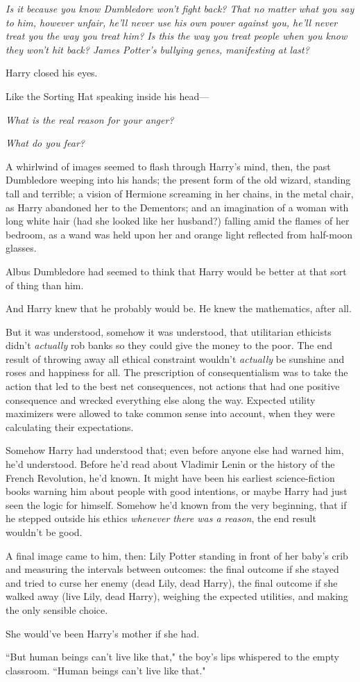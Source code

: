 \emph{Is it because you know Dumbledore won't fight back? That no matter what you say to him, however unfair, he'll never use his own power against you, he'll never treat you the way you treat him? Is this the way you treat people when you know they won't hit back? James Potter's bullying genes, manifesting at last?}

Harry closed his eyes.

Like the Sorting Hat speaking inside his head—

\emph{What is the real reason for your anger?}

\emph{What do you fear?}

A whirlwind of images seemed to flash through Harry's mind, then, the past Dumbledore weeping into his hands; the present form of the old wizard, standing tall and terrible; a vision of Hermione screaming in her chains, in the metal chair, as Harry abandoned her to the Dementors; and an imagination of a woman with long white hair (had she looked like her husband?) falling amid the flames of her bedroom, as a wand was held upon her and orange light reflected from half-moon glasses.

Albus Dumbledore had seemed to think that Harry would be better at that sort of thing than him.

And Harry knew that he probably would be. He knew the mathematics, after all.

But it was understood, somehow it was understood, that utilitarian ethicists didn't \emph{actually} rob banks so they could give the money to the poor. The end result of throwing away all ethical constraint wouldn't \emph{actually} be sunshine and roses and happiness for all. The prescription of consequentialism was to take the action that led to the best net consequences, not actions that had one positive consequence and wrecked everything else along the way. Expected utility maximizers were allowed to take common sense into account, when they were calculating their expectations.

Somehow Harry had understood that; even before anyone else had warned him, he'd understood. Before he'd read about Vladimir Lenin or the history of the French Revolution, he'd known. It might have been his earliest science-fiction books warning him about people with good intentions, or maybe Harry had just seen the logic for himself. Somehow he'd known from the very beginning, that if he stepped outside his ethics \emph{whenever there was a reason}, the end result wouldn't be good.

A final image came to him, then: Lily Potter standing in front of her baby's crib and measuring the intervals between outcomes: the final outcome if she stayed and tried to curse her enemy (dead Lily, dead Harry), the final outcome if she walked away (live Lily, dead Harry), weighing the expected utilities, and making the only sensible choice.

She would've been Harry's mother if she had.

``But human beings can't live like that," the boy's lips whispered to the empty classroom. ``Human beings can't live like that."

